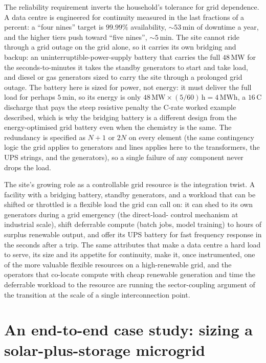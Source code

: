 The reliability requirement inverts the household's tolerance for grid
dependence. A data centre is engineered for continuity measured in the last
fractions of a percent: a ``four nines'' target is $99.99\%$ availability,
$\sim 53\,\si{\minute}$ of downtime a year, and the higher tiers push toward
``five nines'', $\sim 5\,\si{\minute}$. The site cannot ride through a grid
outage on the grid alone, so it carries its own bridging and backup: an
uninterruptible-power-supply battery that carries the full $48\,\si{\mega
\watt}$ for the seconds-to-minutes it takes the standby generators to start
and take load, and diesel or gas generators sized to carry the site through a
prolonged grid outage. The battery here is sized for power, not energy: it
must deliver the full load for perhaps $5\,\si{\minute}$, so its energy is
only $48\,\si{\mega\watt}\times (5/60)\,\si{\hour} = 4\,\si{\mega\watt\hour}$,
a $16\,\text{C}$ discharge that pays the steep resistive penalty the C-rate
worked example described, which is why the bridging battery is a different
design from the energy-optimised grid battery even when the chemistry is the
same. The redundancy is specified as $N{+}1$ or $2N$ on every element (the
same contingency logic the grid applies to generators and lines applies here
to the transformers, the UPS strings, and the generators), so a single
failure of any component never drops the load.

The site's growing role as a controllable grid resource is the integration
twist. A facility with a bridging battery, standby generators, and a workload
that can be shifted or throttled is a flexible load the grid can call on: it
can shed to its own generators during a grid emergency (the direct-load-
control mechanism at industrial scale), shift deferrable compute (batch jobs,
model training) to hours of surplus renewable output, and offer its UPS
battery for fast frequency response in the seconds after a trip. The same
attributes that make a data centre a hard load to serve, its size and its
appetite for continuity, make it, once instrumented, one of the more valuable
flexible resources on a high-renewable grid, and the operators that co-locate
compute with cheap renewable generation and time the deferrable workload to
the resource are running the sector-coupling argument of the transition at the
scale of a single interconnection point.

\section{An end-to-end case study: sizing a solar-plus-storage microgrid}

